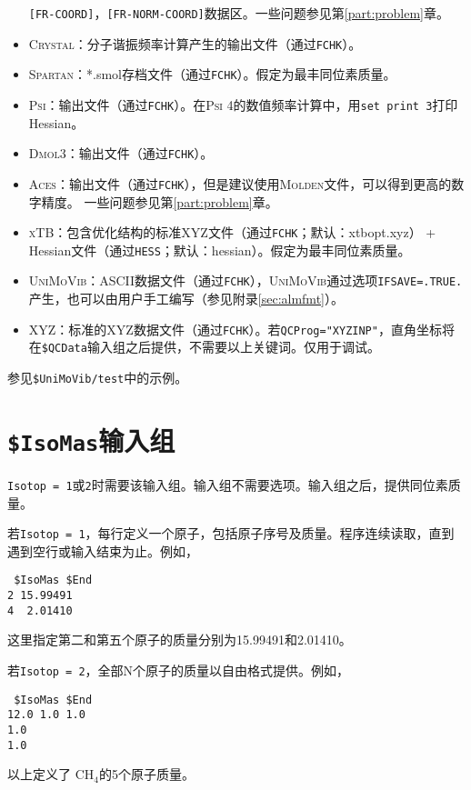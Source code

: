 \documentclass[12pt,a4paper,openany,twoside,cap,UTF8]{ctexbook}
\begin{document}
\begin{itemize}
\verb|[FR-COORD]|，\verb|[FR-NORM-COORD]|数据区。一些问题参见第\ref{part:problem}章。
\item \textsc{Crystal}：分子谐振频率计算产生的输出文件（通过\verb|FCHK|）。
\item \textsc{Spartan}：*.smol存档文件（通过\verb|FCHK|）。假定为最丰同位素质量。
\item \textsc{Psi}：输出文件（通过\verb|FCHK|）。在\textsc{Psi} 4的数值频率计算中，用\texttt{set print 3}打印Hessian。
\item \textsc{Dmol3}：输出文件（通过\verb|FCHK|）。
\item \textsc{Aces}：输出文件（通过\verb|FCHK|），但是建议使用\textsc{Molden}文件，可以得到更高的数字精度。 一些问题参见第\ref{part:problem}章。
\item \textsc{xTB}：包含优化结构的标准XYZ文件（通过\verb|FCHK|；默认：xtbopt.xyz） + Hessian文件（通过\verb|HESS|；默认：hessian）。假定为最丰同位素质量。
\item \textsc{UniMoVib}：ASCII数据文件（通过\verb|FCHK|），\textsc{UniMoVib}通过选项\verb|IFSAVE=.TRUE.|产生，也可以由用户手工编写（参见附录\ref{sec:almfmt}）。
\item XYZ：标准的XYZ数据文件（通过\verb|FCHK|）。若\verb|QCProg="XYZINP"|，直角坐标将在\texttt{\$QCData}输入组之后提供，不需要以上关键词。仅用于调试。
\end{itemize}

参见\verb|$UniMoVib/test|中的示例。

\section{\texttt{\$IsoMas}输入组} \label{sec:inp-isomas}

\verb|Isotop = 1|或\verb|2|时需要该输入组。输入组不需要选项。输入组之后，提供同位素质量。

\bigskip{}\noindent
若\verb|Isotop = 1|，每行定义一个原子，包括原子序号及质量。程序连续读取，直到遇到空行或输入结束为止。例如，
\begin{colorboxed}[oval=false,boxcolor=blue!75!black,bgcolor=blue!5!white]
\ttfamily
\begin{lstlisting}
 $IsoMas $End
2 15.99491
4  2.01410
\end{lstlisting}\end{colorboxed}
这里指定第二和第五个原子的质量分别为15.99491和2.01410。

\bigskip{}\noindent
若\verb|Isotop = 2|，全部N个原子的质量以自由格式提供。例如，\\
\begin{colorboxed}[oval=false,boxcolor=blue!75!black,bgcolor=blue!5!white]
\ttfamily
\begin{lstlisting}
 $IsoMas $End
12.0 1.0 1.0
1.0
1.0
\end{lstlisting}\end{colorboxed}
以上定义了 CH$_4$的5个原子质量。
\end{document}
